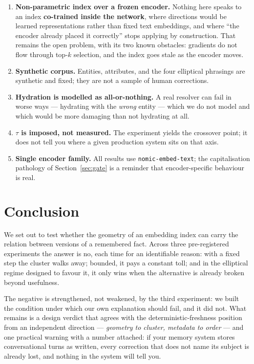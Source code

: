 \documentclass[11pt,a4paper]{article}
\begin{document}
\begin{enumerate}
\item \textbf{Non-parametric index over a frozen encoder.} Nothing here speaks to an index
      \textbf{co-trained inside the network}, where directions would be learned representations
      rather than fixed text embeddings, and where ``the encoder already placed it correctly'' stops
      applying by construction. That remains the open problem, with its two known obstacles:
      gradients do not flow through top-$k$ selection, and the index goes stale as the encoder moves.
\item \textbf{Synthetic corpus.} Entities, attributes, and the four elliptical phrasings are
      synthetic and fixed; they are not a sample of human corrections.
\item \textbf{Hydration is modelled as all-or-nothing.} A real resolver can fail in worse ways ---
      hydrating with the \emph{wrong} entity --- which we do not model and which would be more
      damaging than not hydrating at all.
\item \textbf{$\tau$ is imposed, not measured.} The experiment yields the crossover point; it does
      not tell you where a given production system sits on that axis.
\item \textbf{Single encoder family.} All results use \texttt{nomic-embed-text}; the capitalisation
      pathology of Section~\ref{sec:gate} is a reminder that encoder-specific behaviour is real.
\end{enumerate}

\section{Conclusion}

We set out to test whether the geometry of an embedding index can carry the relation between
versions of a remembered fact. Across three pre-registered experiments the answer is no, each time
for an identifiable reason: with a fixed step the cluster walks away; bounded, it pays a constant
toll; and in the elliptical regime designed to favour it, it only wins when the alternative is
already broken beyond usefulness.

The negative is strengthened, not weakened, by the third experiment: we built the condition under
which our own explanation should fail, and it did not. What remains is a design verdict that agrees
with the deterministic-freshness position from an independent direction --- \emph{geometry to
cluster, metadata to order} --- and one practical warning with a number attached: if your memory
system stores conversational turns as written, every correction that does not name its subject is
already lost, and nothing in the system will tell you.
\end{document}
